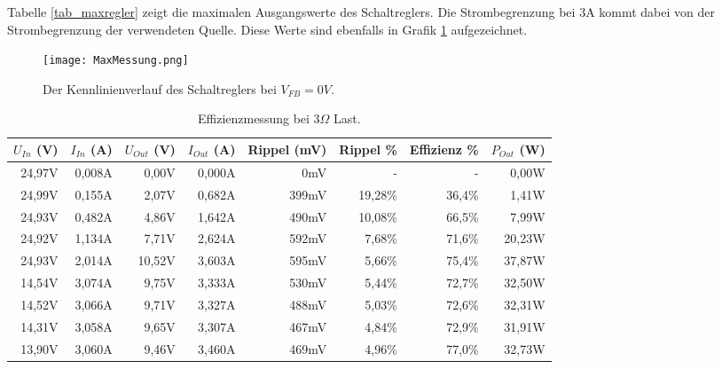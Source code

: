 Tabelle \ref{tab_maxregler} zeigt die maximalen Ausgangswerte des Schaltreglers. Die Strombegrenzung bei 3A kommt dabei von der Strombegrenzung der verwendeten Quelle. Diese Werte sind ebenfalls in Grafik \ref{fig:MaxMessung} aufgezeichnet.

\begin{figure}[h!]
	\centering
		\texttt{[image: MaxMessung.png]}
	\caption{Der Kennlinienverlauf des Schaltreglers bei $V_{FB}=0V$.}
	\label{fig:MaxMessung}
\end{figure}

\newpage

\begin{table}[h]
\centering
\begin{tabular}{|r|r|r|r|r|r|r|r|}
\hline
$U_{In}$ (V) & $I_{In}$ (A) & $U_{Out}$ (V) & $I_{Out}$ (A) & Rippel (mV) & Rippel \% & Effizienz \% & $P_{Out}$ (W) \\ \hline
24,97V   & 0,008A   & 0,00V        & 0,000A        & 0mV           & -         & -            & 0,00W      \\ \hline
24,99V   & 0,155A   & 2,07V    & 0,682A    & 399mV         & 19,28\%     & 36,4\%         & 1,41W   \\ \hline
24,93V   & 0,482A   & 4,86V    & 1,642A    & 490mV         & 10,08\%     & 66,5\%         & 7,99W   \\ \hline
24,92V   & 1,134A   & 7,71V     & 2,624A    & 592mV         & 7,68\%      & 71,6\%         & 20,23W  \\ \hline
24,93V   & 2,014A   & 10,52V    & 3,603A      & 595mV         & 5,66\%      & 75,4\%         & 37,87W  \\ \hline
14,54V   & 3,074A   & 9,75V     & 3,333A    & 530mV         & 5,44\%      & 72,7\%         & 32,50W  \\ \hline
14,52V   & 3,066A   & 9,71V     & 3,327A    & 488mV         & 5,03\%      & 72,6\%         & 32,31W  \\ \hline
14,31V   & 3,058A   & 9,65V     & 3,307A    & 467mV         & 4,84\%      & 72,9\%         & 31,91W  \\ \hline
13,90V    & 3,060A    & 9,46V     & 3,460A     & 469mV         & 4,96\%      & 77,0\%         & 32,73W  \\ \hline
\end{tabular}
\caption{Effizienzmessung bei 3$\Omega$ Last.}
\label{fig::Res3}
\end{table}

